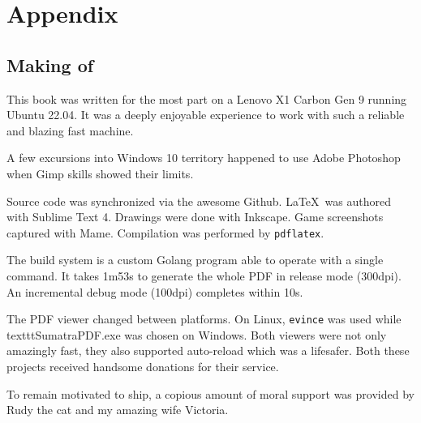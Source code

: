 \chapter{Appendix} 

\section{Making of}

This book was written for the most part on a Lenovo X1 Carbon Gen 9 running Ubuntu 22.04. It was a deeply enjoyable experience to work with such a reliable and blazing fast machine. 


A few excursions into Windows 10 territory happened to use Adobe Photoshop when Gimp skills showed their limits. 

Source code was synchronized via the awesome Github. \LaTeX\ was authored with Sublime Text 4. Drawings were done with Inkscape. Game screenshots captured with Mame. Compilation was performed by \texttt{pdflatex}.

The build system is a custom Golang program able to operate with a single  command. It takes 1m53s to generate the whole PDF in release mode (300dpi). An incremental debug mode (100dpi) completes within 10s. 

The PDF viewer changed between platforms. On Linux, \texttt{evince} was used while texttt{SumatraPDF.exe} was chosen on Windows. Both viewers were not only amazingly fast, they also supported auto-reload which was a lifesafer. Both these projects received handsome donations for their service.

To remain motivated to ship, a copious amount of moral support was provided by Rudy the cat and my amazing wife Victoria.

